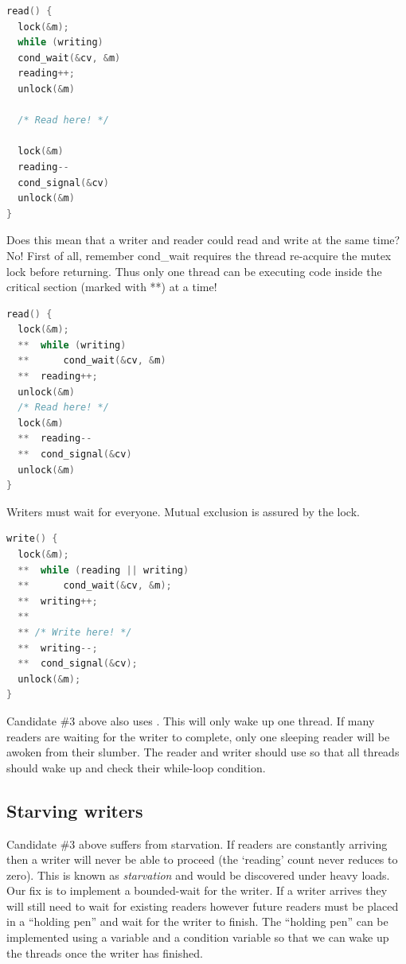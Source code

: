 \begin{lstlisting}[language=C]
read() {
  lock(&m);
  while (writing)
  cond_wait(&cv, &m)
  reading++;
  unlock(&m)

  /* Read here! */

  lock(&m)
  reading--
  cond_signal(&cv)
  unlock(&m)
}
\end{lstlisting}

Does this mean that a writer and reader could read and write at the same time?
No! First of all, remember cond\_wait requires the thread re-acquire the mutex lock before returning.
Thus only one thread can be executing code inside the critical section (marked with **) at a time!

\begin{lstlisting}[language=C]
read() {
  lock(&m);
  **  while (writing)
  **      cond_wait(&cv, &m)
  **  reading++;
  unlock(&m)
  /* Read here! */
  lock(&m)
  **  reading--
  **  cond_signal(&cv)
  unlock(&m)
}
\end{lstlisting}

Writers must wait for everyone.
Mutual exclusion is assured by the lock.

\begin{lstlisting}[language=C]
write() {
  lock(&m);
  **  while (reading || writing)
  **      cond_wait(&cv, &m);
  **  writing++;
  **
  ** /* Write here! */
  **  writing--;
  **  cond_signal(&cv);
  unlock(&m);
}
\end{lstlisting}

Candidate \#3 above also uses .
This will only wake up one thread.
If many readers are waiting for the writer to complete, only one sleeping reader will be awoken from their slumber.
The reader and writer should use  so that all threads should wake up and check their while-loop condition.

\subsection{Starving writers}

Candidate \#3 above suffers from starvation.
If readers are constantly arriving then a writer will never be able to proceed (the `reading' count never reduces to zero).
This is known as \emph{starvation} and would be discovered under heavy loads.
Our fix is to implement a bounded-wait for the writer.
If a writer arrives they will still need to wait for existing readers however future readers must be placed in a ``holding pen'' and wait for the writer to finish.
The ``holding pen'' can be implemented using a variable and a condition variable so that we can wake up the threads once the writer has finished.

